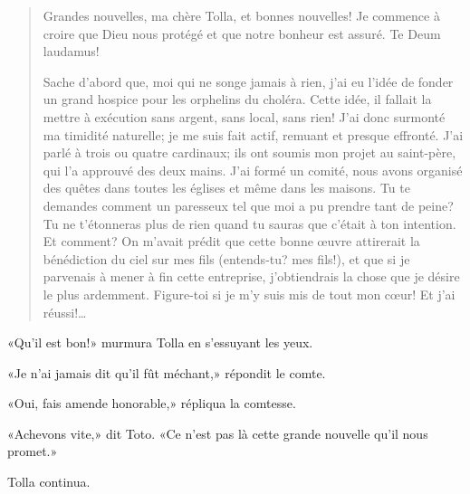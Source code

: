 \begin{quote}
Grandes nouvelles, ma chère Tolla, et bonnes nouvelles! Je commence à
croire que Dieu nous protégé et que notre bonheur est assuré. Te Deum
laudamus!

Sache d'abord que, moi qui ne songe jamais à rien, j'ai eu l'idée de
fonder un grand hospice pour les orphelins du choléra. Cette idée, il
fallait la mettre à exécution sans argent, sans local, sans rien! J'ai
donc surmonté ma timidité naturelle; je me suis fait actif, remuant et
presque effronté. J'ai parlé à trois ou quatre cardinaux; ils ont soumis
mon projet au saint-père, qui l'a approuvé des deux mains. J'ai formé un
comité, nous avons organisé des quêtes dans toutes les églises et même
dans les maisons. Tu te demandes comment un paresseux tel que moi a pu
prendre tant de peine? Tu ne t'étonneras plus de rien quand tu sauras
que c'était à ton intention. Et comment? On m'avait prédit que cette
bonne œuvre attirerait la bénédiction du ciel sur mes fils (entends-tu?
mes fils!), et que si je parvenais à mener à fin cette entreprise,
j'obtiendrais la chose que je désire le plus ardemment. Figure-toi si je
m'y suis mis de tout mon cœur! Et j'ai réussi!\ldots{}
\end{quote}

«Qu'il est bon!» murmura Tolla en s'essuyant les yeux.

«Je n'ai jamais dit qu'il fût méchant,» répondit le comte.

«Oui, fais amende honorable,» répliqua la comtesse.

«Achevons vite,» dit Toto. «Ce n'est pas là cette grande nouvelle qu'il
nous promet.»

Tolla continua.

